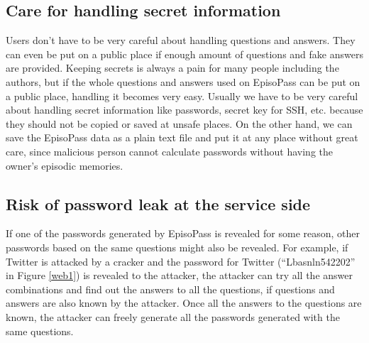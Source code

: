 \documentclass[runningheads,a4paper]{llncs}
\begin{document}
\subsection{Care for handling secret information}

Users don't have to be very careful about handling questions and answers.
They can even be put on a public place
if enough amount of questions and fake answers are provided.
%
Keeping secrets is always a pain for many people including
the authors, but if the whole questions and answers used on EpisoPass
can be put on a public place,
handling it becomes very easy.
Usually we have to be very careful about handling
secret information like passwords, secret key for SSH, etc.
because they should not be copied or saved at unsafe places.
On the other hand,
we can save the EpisoPass data as a plain text file and put it at
any place without great care, since malicious person cannot calculate
passwords without having the owner's episodic memories.

% 
% 
%

\subsection{Risk of password leak at the service side}

If one of the passwords generated by EpisoPass is revealed
for some reason, other passwords based on the same questions
might also be revealed.
%
For example, if Twitter is attacked by a cracker and
the password for Twitter (``\textsf{Lbasnln542202}'' in Figure \ref{web1})
is revealed to the attacker,
the attacker can try all the answer combinations and find out
the answers to all the questions,
if questions and answers are also known by the attacker.
Once all the answers to the questions are known,
the attacker can freely generate all the passwords
generated with the same questions.
\end{document}
